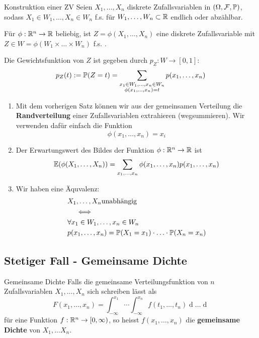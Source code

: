 \begin{subbox}{Konstruktion einer ZV}
    Seien $X_1, \ldots, X_n$ diskrete Zufallsvariablen in $(\Omega, \F, \P)$, sodass $X_1 \in W_1, \ldots, X_n \in W_n$ f.s. für $W_1, \ldots, W_n \subset \R$ endlich oder abzählbar.

    Für $\phi: \R^n \to \R$ beliebig, ist $Z = \phi(X_1, \ldots, X_n)$ eine diskrete Zufallsvariable mit $Z \in W = \phi(W_1 \times \ldots \times W_n)$ f.s. . 

    Die Gewichtsfunktion von $Z$ ist gegeben durch $p_Z: W \to [0,1]$:
    $$p_Z(t) := \P(Z = t) = \sum_{\substack{x_1 \in W_1, \ldots, x_n \in W_n\\ \phi(x_1, \ldots, x_n) = t}} p(x_1, \ldots, x_n)$$
\end{subbox}
\begin{enumerate}
    \item Mit dem vorherigen Satz können wir aus der gemeinsamen Verteilung die \textbf{Randverteilung} einer Zufallsvariablen extrahieren (wegsummieren). Wir verwenden dafür einfach die Funktion 
    $$\phi(x_1, \ldots, x_n) = x_i$$
    \item Der Erwartungswert des Bildes der Funktion $\phi: \R^n \to \R$ ist
    $$\E(\phi(X_1, \ldots, X_n)) = \sum_{x_1, \ldots, x_n}\phi(x_1, \ldots, x_n)p(x_1, \ldots, x_n)$$
    \item Wir haben eine Äquvalenz: 
    \begin{align*}
        &X_1, \ldots, X_n \text{unabhängig}\\
        &\quad \iff \\
        &\forall x_1 \in W_1, \ldots, x_n \in W_n\\
        &p(x_1, \ldots, x_n) = \P(X_1 = x_1) \cdot \ldots \cdot \P(X_n = x_n)
    \end{align*}
\end{enumerate}

\subsection{Stetiger Fall - Gemeinsame Dichte}
\begin{mainbox}{Gemeinsame Dichte}
    Falls die gemeinsame Verteilungsfunktion von $n$ Zufallsvariablen $X_1, \ldots, X_n$ sich schreiben lässt als
    $$F(x_1, \ldots, x_n) = \int_{-\infty}^{x_1} \cdots \int_{-\infty}^{x_n}f(t_1, \ldots, t_n) \mathop{dt_n}\ldots\mathop{dt_1}$$
    für eine Funktion $f: \R^n \to [0, \infty)$, so heisst $f(x_1, \ldots, x_n)$ die \textbf{gemeinsame Dichte} von $X_1, \ldots X_n$.
\end{mainbox}
   
